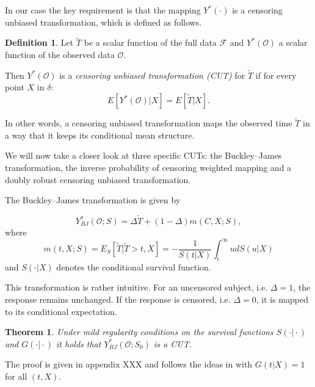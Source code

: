 \documentclass[12pt, a4paper]{scrartcl}
\theoremstyle{definition}
\newtheorem{Definition}{Definition}[section]
\theoremstyle{plain}
\newtheorem{Theorem}{Theorem}[section]
\numberwithin{equation}{section}
\numberwithin{figure}{section}
\numberwithin{table}{section}
\begin{document}
	In our case the key requirement is that the mapping $Y^*(\cdot)$ is a censoring unbiased transformation, which is defined as follows.
	
	\begin{Definition}
	Let $\tilde T$ be a scalar function of the full data $\mathcal{F}$ and $Y^*(\mathcal{O})$ a scalar function of the observed data $\mathcal{O}$.
	
	Then $Y^*(\mathcal{O})$ is a \textit{censoring unbiased transformation (CUT)} for $\tilde T$ if for every point $X$ in $\delta$:
	\begin{equation*}
	E[Y^*(\mathcal{O}) \vert X] = E[\tilde T \vert X].
	\end{equation*}
	\end{Definition}

	In other words, a censoring unbiased transformation maps the observed time $\tilde T$ in a way that it keeps its conditional mean structure.
	
	We will now take a closer look at three specific CUTs: the Buckley--James transformation, the inverse probability of censoring weighted mapping and a doubly robust censoring unbiased transformation.
	
	The Buckley--James transformation is given by
	
	\begin{equation}\label{eq:bjtrafo}
		Y_{BJ}^* (\mathcal{O}; S) = \Delta \tilde{T} + (1-\Delta)m(C,X;S),
	\end{equation}
	where
	\begin{equation}\label{eq:condmean}
		m(t,X;S) = E_S[\tilde{T} \vert \tilde T > t, X] = -\frac{1}{S(t\vert X)} \int_t^{\infty} u dS(u\vert X)
	\end{equation}%
	and $S(\cdot\vert X)$ denotes the conditional survival function.
	
	
	This transformation is rather intuitive.
	For an uncensored subject, i.e. $\Delta = 1$, the response remains unchanged.
	If the response is censored, i.e. $\Delta = 0$, it is mapped to its conditional expectation. %
	
	\begin{Theorem}\label{thm:bj}
		Under mild regularity conditions on the survival functions $S(\cdot\vert\cdot)$ and $G(\cdot\vert\cdot)$ it holds that $Y_{BJ}^*(\mathcal{O}; S_0)$ is a CUT.
	\end{Theorem}
	
	The proof is given in appendix XXX and follows the ideas in \citet*{drcut} with $G(t\vert X)=1$ for all $(t,X)$.
	
\end{document}
